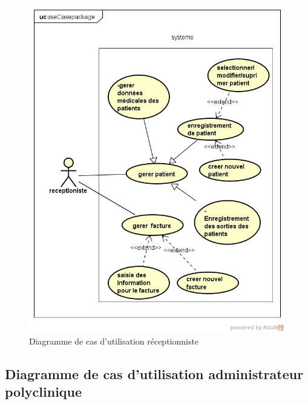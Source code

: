 	  \begin{figure}[h]
	  \centering
	   \includegraphics[scale=0.5]{Chapitre2/images/ucdreceptioniste}
	    \caption{Diagramme de cas d'utilisation réceptionniste}
	  \end{figure}
	 
\newpage

	\subsection{Diagramme de cas d'utilisation administrateur polyclinique }
	  
